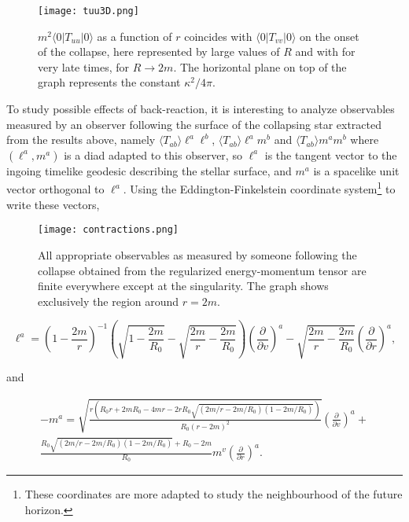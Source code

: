 \documentclass[reprint,amsmath,amssymb,aps,nofootinbib]{revtex4-1}
\begin{document}
\begin{figure}[h]
\begin{center}
 \texttt{[image: tuu3D.png]}
 \end{center}
 \caption{$m^2\langle0|T_{uu}|0\rangle$ as a function of $r$ coincides with $\langle0|T_{vv}|0\rangle$ on the onset of the collapse, here represented by large values of $R$ and with \cite{DFU} for very late times, for $R\to2m$. The horizontal plane on top of the graph represents the constant $\kappa^2/4\pi$.}
\end{figure}

To study possible effects of back-reaction, it is interesting to analyze observables measured by an observer following the surface of the collapsing star extracted from the results above, namely $\langle T_{ab}\rangle\ell^a\ell^b$, $\langle T_{ab}\rangle\ell^am^b$ and $\langle T_{ab}\rangle m^am^b$ where $(\ell^a,m^a)$ is a diad adapted to this observer, so $\ell^a$ is the tangent vector to the ingoing timelike geodesic describing the stellar surface, and $m^a$ is a spacelike unit vector orthogonal to $\ell^a$. Using the Eddington-Finkelstein coordinate system\footnote{These coordinates are more adapted to study the neighbourhood of the future horizon.} to write these vectors,
\begin{figure}[h]
 \begin{center}
  \texttt{[image: contractions.png]}
 \end{center}
\caption{All appropriate observables as measured by someone following the collapse obtained from the regularized energy-momentum tensor are finite everywhere except at the singularity. The graph shows exclusively the region around $r=2m$.}
\end{figure}

\begin{widetext}
\begin{equation}
\ell^a=\left(1-\frac{2m}{r}\right)^{-1}\left(\sqrt{1-\frac{2m}{R_0}}-\sqrt{\frac{2m}{r}-\frac{2m}{R_0}}\right)\left(\frac{\partial}{\partial v}\right)^a-\sqrt{\frac{2m}{r}-\frac{2m}{R_0}}\left(\frac{\partial}{\partial r}\right)^a,
\label{tanvec}
\end{equation}

and

\begin{multline}
 -m^a=\sqrt{\frac{r\left(R_0r+2mR_0-4mr-2rR_0\sqrt{(2m/r-2m/R_0)(1-2m/R_0)}\right)}{R_0(r-2m)^2}}\left(\frac{\partial}{\partial v}\right)^a+\\
 \frac{R_0\sqrt{(2m/r-2m/R_0)(1-2m/R_0)}+R_0-2m}{R_0}m^v\left(\frac{\partial}{\partial r}\right)^a.
 \label{ortvec}
\end{multline}
\end{widetext}
\end{document}
